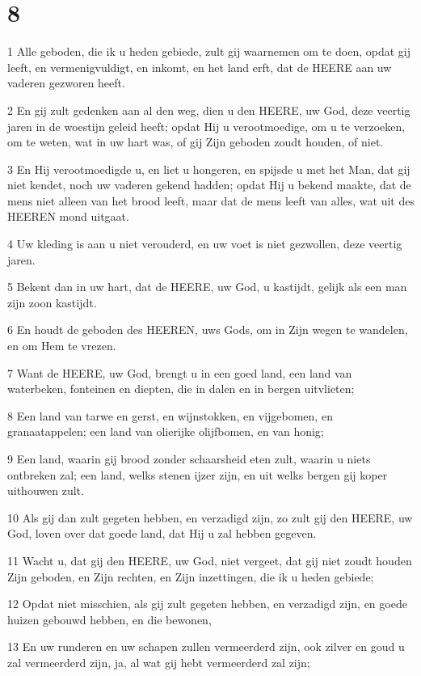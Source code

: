\chapter{8}

\par 1 Alle geboden, die ik u heden gebiede, zult gij waarnemen om te doen, opdat gij leeft, en vermenigvuldigt, en inkomt, en het land erft, dat de HEERE aan uw vaderen gezworen heeft.
\par 2 En gij zult gedenken aan al den weg, dien u den HEERE, uw God, deze veertig jaren in de woestijn geleid heeft; opdat Hij u verootmoedige, om u te verzoeken, om te weten, wat in uw hart was, of gij Zijn geboden zoudt houden, of niet.
\par 3 En Hij verootmoedigde u, en liet u hongeren, en spijsde u met het Man, dat gij niet kendet, noch uw vaderen gekend hadden; opdat Hij u bekend maakte, dat de mens niet alleen van het brood leeft, maar dat de mens leeft van alles, wat uit des HEEREN mond uitgaat.
\par 4 Uw kleding is aan u niet verouderd, en uw voet is niet gezwollen, deze veertig jaren.
\par 5 Bekent dan in uw hart, dat de HEERE, uw God, u kastijdt, gelijk als een man zijn zoon kastijdt.
\par 6 En houdt de geboden des HEEREN, uws Gods, om in Zijn wegen te wandelen, en om Hem te vrezen.
\par 7 Want de HEERE, uw God, brengt u in een goed land, een land van waterbeken, fonteinen en diepten, die in dalen en in bergen uitvlieten;
\par 8 Een land van tarwe en gerst, en wijnstokken, en vijgebomen, en granaatappelen; een land van olierijke olijfbomen, en van honig;
\par 9 Een land, waarin gij brood zonder schaarsheid eten zult, waarin u niets ontbreken zal; een land, welks stenen ijzer zijn, en uit welks bergen gij koper uithouwen zult.
\par 10 Als gij dan zult gegeten hebben, en verzadigd zijn, zo zult gij den HEERE, uw God, loven over dat goede land, dat Hij u zal hebben gegeven.
\par 11 Wacht u, dat gij den HEERE, uw God, niet vergeet, dat gij niet zoudt houden Zijn geboden, en Zijn rechten, en Zijn inzettingen, die ik u heden gebiede;
\par 12 Opdat niet misschien, als gij zult gegeten hebben, en verzadigd zijn, en goede huizen gebouwd hebben, en die bewonen,
\par 13 En uw runderen en uw schapen zullen vermeerderd zijn, ook zilver en goud u zal vermeerderd zijn, ja, al wat gij hebt vermeerderd zal zijn;
